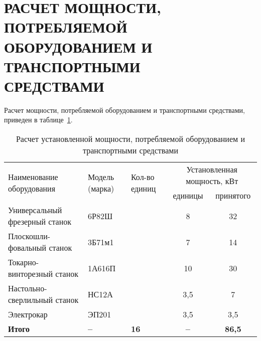 \section[
Расчет мощности, потребляемой оборудованием и транспортными \\
средствами]{
  РАСЧЕТ МОЩНОСТИ, ПОТРЕБЛЯЕМОЙ \\
  ОБОРУДОВАНИЕМ И  ТРАНСПОРТНЫМИ \\ 
  СРЕДСТВАМИ
}
\label{sec:placement}

Расчет мощности, потребляемой оборудованием и транспортными средствами, 
приведен в таблице~\ref{tbl:tech_power}.

\begin{table} [h!]
  \caption{
    Расчет установленной мощности, потребляемой
    оборудованием и транспортными средствами 
  }\label{tbl:tech_power}
    \begin{tabular}{| m{4cm} | m{2cm} | m{2cm} | c | c |}
      \hline
      \multirow{2}{*}{\parbox{4cm}{
          \smallskip
          \centering Наименование оборудования
          \smallskip
        }
      }
      & \multirow{2}{*}{\parbox{2cm}{
            \smallskip
            \centering Модель (марка)
            \smallskip
          } 
        }
      & \multirow{2}{*}{\parbox{2cm}{
            \smallskip
            \centering Кол-во единиц
            \smallskip
          }
        }
      & \multicolumn{2}{c|}{Установленная мощность, кВт} \\ \cline{4-5}

      & & 
      & \parbox{3cm}{\centering единицы} 
      & \parbox{3cm}{\centering принятого} \\
      \hline

      Универсальный фрезерный станок & \centering 6Р82Ш 
      &  & 8 & 32 \\
      \hline

      Плоскошли- фовальный станок & \centering 3Б71м1 
      &  & 7 & 14 \\
      \hline

      Токарно-винторезный станок & \centering 1А616П 
      &  & 10 & 30 \\
      \hline

      Настольно-сверлильный станок & \centering НС12А 
      &  & 3{,}5 & 7 \\
      \hline

      Электрокар & \centering ЭП201 
      &  & 3{,}5 & 3{,}5 \\
      \hline

      \raggedleft \textbf{Итого} & \centering \textbf{--} 
      & \centering \textbf{16} & \textbf{--} & \textbf{86{,}5} \\
      \hline
    \end{tabular}
\end{table}
